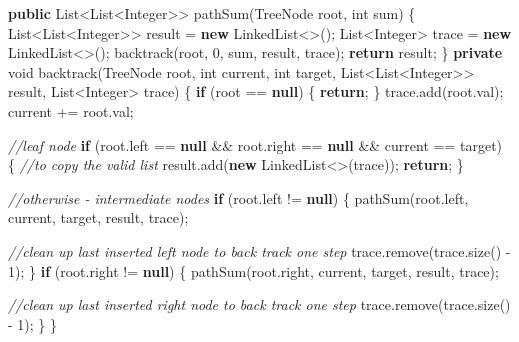 \documentclass[]{book}
\newenvironment{Shaded}{\begin{snugshade}}{\end{snugshade}}
\newcommand{\BuiltInTok}[1]{#1}
\newcommand{\CommentTok}[1]{\textcolor[rgb]{0.56,0.35,0.01}{\textit{#1}}}
\newcommand{\DataTypeTok}[1]{\textcolor[rgb]{0.13,0.29,0.53}{#1}}
\newcommand{\DecValTok}[1]{\textcolor[rgb]{0.00,0.00,0.81}{#1}}
\newcommand{\FunctionTok}[1]{\textcolor[rgb]{0.00,0.00,0.00}{#1}}
\newcommand{\KeywordTok}[1]{\textcolor[rgb]{0.13,0.29,0.53}{\textbf{#1}}}
\newcommand{\NormalTok}[1]{#1}
\begin{document}
\begin{Shaded}
\begin{Highlighting}[]
\KeywordTok{public} \BuiltInTok{List}\NormalTok{<}\BuiltInTok{List}\NormalTok{<}\BuiltInTok{Integer}\NormalTok{>> }\FunctionTok{pathSum}\NormalTok{(}\BuiltInTok{TreeNode}\NormalTok{ root, }\DataTypeTok{int}\NormalTok{ sum) \{}
    \BuiltInTok{List}\NormalTok{<}\BuiltInTok{List}\NormalTok{<}\BuiltInTok{Integer}\NormalTok{>> result = }\KeywordTok{new} \BuiltInTok{LinkedList}\NormalTok{<>();}
    \BuiltInTok{List}\NormalTok{<}\BuiltInTok{Integer}\NormalTok{> trace = }\KeywordTok{new} \BuiltInTok{LinkedList}\NormalTok{<>();}
    \FunctionTok{backtrack}\NormalTok{(root, }\DecValTok{0}\NormalTok{, sum, result, trace);}
    \KeywordTok{return}\NormalTok{ result;}
\NormalTok{\}}
\KeywordTok{private} \DataTypeTok{void} \FunctionTok{backtrack}\NormalTok{(}\BuiltInTok{TreeNode}\NormalTok{ root, }\DataTypeTok{int}\NormalTok{ current, }\DataTypeTok{int}\NormalTok{ target, }\BuiltInTok{List}\NormalTok{<}\BuiltInTok{List}\NormalTok{<}\BuiltInTok{Integer}\NormalTok{>> result, }\BuiltInTok{List}\NormalTok{<}\BuiltInTok{Integer}\NormalTok{> trace) \{}
    \KeywordTok{if}\NormalTok{ (root == }\KeywordTok{null}\NormalTok{) \{}
        \KeywordTok{return}\NormalTok{;}
\NormalTok{    \}}
\NormalTok{    trace.}\FunctionTok{add}\NormalTok{(root.}\FunctionTok{val}\NormalTok{);}
\NormalTok{    current += root.}\FunctionTok{val}\NormalTok{;}

    \CommentTok{//leaf node}
    \KeywordTok{if}\NormalTok{ (root.}\FunctionTok{left}\NormalTok{ == }\KeywordTok{null}\NormalTok{ && root.}\FunctionTok{right}\NormalTok{ == }\KeywordTok{null}\NormalTok{ && current == target) \{}
        \CommentTok{//to copy the valid list}
\NormalTok{        result.}\FunctionTok{add}\NormalTok{(}\KeywordTok{new} \BuiltInTok{LinkedList}\NormalTok{<>(trace));}
        \KeywordTok{return}\NormalTok{;}
\NormalTok{    \}}

    \CommentTok{//otherwise - intermediate nodes}
    \KeywordTok{if}\NormalTok{ (root.}\FunctionTok{left}\NormalTok{ != }\KeywordTok{null}\NormalTok{) \{}
        \FunctionTok{pathSum}\NormalTok{(root.}\FunctionTok{left}\NormalTok{, current, target, result, trace);}

        \CommentTok{//clean up last inserted left node to back track one step}
\NormalTok{        trace.}\FunctionTok{remove}\NormalTok{(trace.}\FunctionTok{size}\NormalTok{() - }\DecValTok{1}\NormalTok{);}
\NormalTok{    \}}
    \KeywordTok{if}\NormalTok{ (root.}\FunctionTok{right}\NormalTok{ != }\KeywordTok{null}\NormalTok{) \{}
        \FunctionTok{pathSum}\NormalTok{(root.}\FunctionTok{right}\NormalTok{, current, target, result, trace);}

        \CommentTok{//clean up last inserted right node to back track one step}
\NormalTok{        trace.}\FunctionTok{remove}\NormalTok{(trace.}\FunctionTok{size}\NormalTok{() - }\DecValTok{1}\NormalTok{);}
\NormalTok{    \}}
\NormalTok{\}}
\end{Highlighting}
\end{Shaded}
\end{document}

